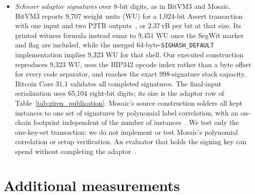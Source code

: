 \documentclass[11pt]{article}
\begin{document}
\begin{itemize}
    secret whose threshold is set by the chunk's checksum and the bit value, so
    a signed chunk opens exactly the labels of its bits. In the source, one
    such Winternitz signature over 508 bits, its Assert, is 3{,}748\,vB, or
    $7.38$\,vB per bit. Our transaction-bound variant
    uses 3-bit digits, eight per chunk, with the checksum split over two
    chains, and the authorization, outputs and controls of the Antichain
    variant. With at most 49 chunks per input, its size is the WOTS row of
    Table~\ref{tab:ziren_publication}, again an all-nonzero worst case. The price is the
    off-chain table, 953{,}151{,}840 bytes at this input size.
    Plain 4-bit Winternitz, modeled from one executed input at 23.06 weight
    units per bit, would be about 3.00\,MvB, but it cannot deliver garbled
    labels without such a table. The challenger must decode digits as consensus
    does and, at setup, reject keys in which one chain end lies within seven
    hashes of another; neither check costs on-chain space.
  \item \emph{Schnorr adaptor signatures} over 8-bit digits, as in BitVM3 and
    Mosaic. BitVM3 reports 9{,}707 weight units (WU) for a 1{,}024-bit Assert
    transaction with one input and two P2TR outputs~\cite{bitvm3paper}, or
    $2.37$\,vB per bit at that size. Its printed witness formula instead sums to
    9{,}451 WU once the SegWit marker and flag are included, while the merged
    64-byte-\texttt{SIGHASH\_DEFAULT} implementation implies 9{,}323 WU for
    that shell. Our executed construction reproduces 9{,}323 WU, uses the BIP342
    opcode index rather than a byte offset for every code separator, and reaches
    the exact 998-signature stack capacity. Bitcoin Core 31.1 validates all completed
    signatures. The final-input serialization uses 65{,}104 eight-bit digits;
    its size is the adaptor row
    of Table~\ref{tab:ziren_publication}. Mosaic's source construction solders all
    kept instances to one set of signatures by polynomial label correlation,
    with an on-chain footprint independent of the number of
    instances~\cite{mosaic26}. We test only the one-key-set
    transaction; we do not implement or test Mosaic's polynomial
    correlation or setup verification. An evaluator that holds the signing key can spend
    without completing the adaptor~\cite{antichain26}.
\end{itemize}
\section{Additional measurements}\label{app:eval}
\end{document}

